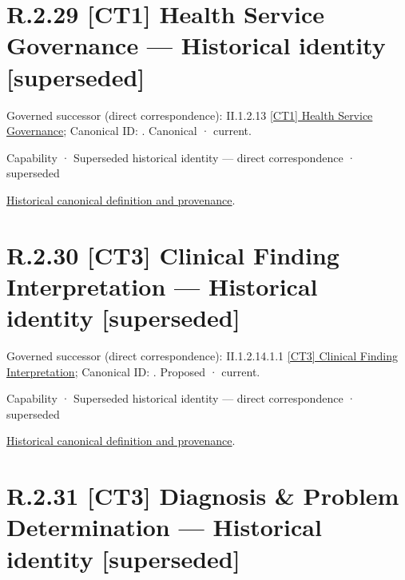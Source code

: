 \section*{R.2.29 [CT1] Health Service Governance — Historical identity [superseded]}
\label{navigation:R.2.29}

{\small Governed successor (direct correspondence): II.1.2.13 \hyperref[element:209aada781e844e28202a2535a264c21]{[CT1] Health Service Governance}; Canonical ID: \texttt{}. Canonical · current.}\par
\label{element:24f3dd30223142efa35a5826552d53ab}
{\small Capability · Superseded historical identity — direct correspondence · superseded}\par
\href{../../../../continuum/strategy/capability/24f3dd30223142efa35a5826552d53ab.md}{Historical canonical definition and provenance}.\par
\section*{R.2.30 [CT3] Clinical Finding Interpretation — Historical identity [superseded]}
\label{navigation:R.2.30}

{\small Governed successor (direct correspondence): II.1.2.14.1.1 \hyperref[element:deb78ba3b1514074a8ca5bc5da0673f5]{[CT3] Clinical Finding Interpretation}; Canonical ID: \texttt{}. Proposed · current.}\par
\label{element:cf8ddfca7a8e4ed893ec39b795200d77}
{\small Capability · Superseded historical identity — direct correspondence · superseded}\par
\href{../../../../continuum/strategy/capability/cf8ddfca7a8e4ed893ec39b795200d77.md}{Historical canonical definition and provenance}.\par
\section*{R.2.31 [CT3] Diagnosis \& Problem Determination — Historical identity [superseded]}
\label{navigation:R.2.31}

